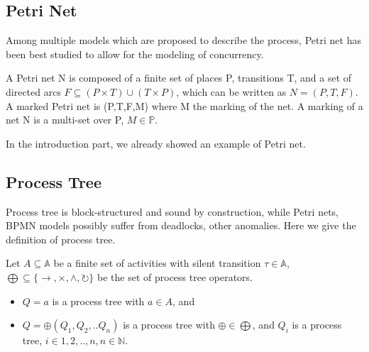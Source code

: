 \subsection{Petri Net}
Among multiple models which are proposed to describe the process, Petri net has been best studied to allow for the modeling of concurrency. 
\begin{definition}
	A Petri net N is composed of a finite set of places P, transitions T, and a set of directed arcs $F \subseteq (P \times T) \cup (T \times P)$, which can be written as $N=(P,T,F)$. A marked Petri net is (P,T,F,M) where M the marking of the net. A marking of a net N is a multi-set over P, $M \in \mathbb{P} $. 
\end{definition}
In the introduction part, we already showed an example of Petri net. 

\subsection{Process Tree}
Process tree is block-structured and sound by construction, while Petri nets, BPMN models possibly suffer from deadlocks, other anomalies\cite{van2016data}. Here we give the definition of process tree.
\begin{definition}
Let $ A \subseteq \mathbb{A} $ be a finite set of activities with silent transition $\tau \in \mathbb{A}$, $\bigoplus \subseteq \{\rightarrow, \times, \land, \circlearrowright\}$ be the set of process tree operators. 
\begin{itemize}
\item $Q=a$ is a process tree with $a\in A$, and 
\item $Q= \oplus (Q_1 , Q_2 ,.. Q_n)$ is a process tree with $\oplus \in \bigoplus$, and $Q_i$ is a process tree, $i\in{1,2,..,n}, n\in \mathbb{N}$. 
\end{itemize}
\end{definition}

